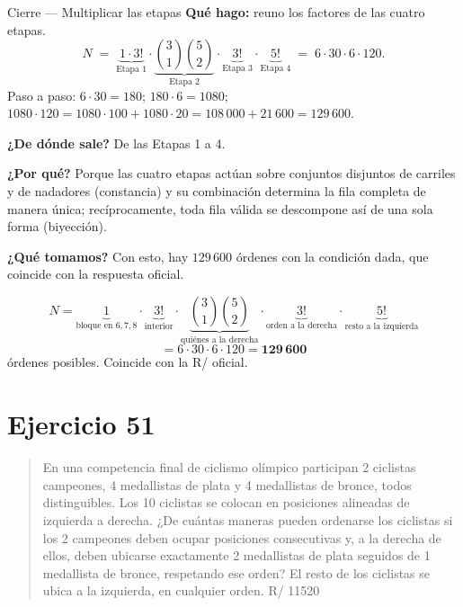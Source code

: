 \documentclass[11pt]{article}
\begin{document}
\begin{paso}{Cierre --- Multiplicar las etapas}
\textbf{Qu\'e hago:} reuno los factores de las cuatro etapas.
\[
N\;=\;\underbrace{1\cdot 3!}_{\text{Etapa 1}}\cdot\underbrace{\binom{3}{1}\binom{5}{2}}_{\text{Etapa 2}}\cdot\underbrace{3!}_{\text{Etapa 3}}\cdot\underbrace{5!}_{\text{Etapa 4}}
\;=\;6\cdot 30\cdot 6\cdot 120 .
\]
Paso a paso: $6\cdot 30=180$; $180\cdot 6=1080$; $1080\cdot 120 = 1080\cdot 100+1080\cdot 20 =
108\,000+21\,600 = 129\,600$.

\textbf{¿De d\'onde sale?} De las Etapas 1 a 4.

\textbf{¿Por qu\'e?} Porque las cuatro etapas actúan sobre conjuntos disjuntos de carriles y de nadadores
(constancia) y su combinaci\'on determina la fila completa de manera \'unica; rec\'iprocamente, toda fila
v\'alida se descompone as\'i de una sola forma (biyecci\'on).

\textbf{¿Qu\'e tomamos?} Con esto, hay $129\,600$ \'ordenes con la condici\'on dada, que coincide con la
respuesta oficial.
\end{paso}

\begin{resp}
\[
N=\underbrace{1}_{\text{bloque en }6,7,8}\cdot\underbrace{3!}_{\text{interior}}\cdot\underbrace{\binom{3}{1}\binom{5}{2}}_{\text{qui\'enes a la derecha}}\cdot\underbrace{3!}_{\text{orden a la derecha}}\cdot\underbrace{5!}_{\text{resto a la izquierda}}
\]
\[
=6\cdot 30\cdot 6\cdot 120=\mathbf{129\,600}
\]
\'ordenes posibles. Coincide con la R/ oficial.
\end{resp}

\section*{Ejercicio 51}

\begin{quote}
En una competencia final de ciclismo ol\'impico participan 2 ciclistas campeones, 4 medallistas de plata y 4
medallistas de bronce, todos distinguibles. Los 10 ciclistas se colocan en posiciones alineadas de izquierda
a derecha. ¿De cu\'antas maneras pueden ordenarse los ciclistas si los 2 campeones deben ocupar posiciones
consecutivas y, a la derecha de ellos, deben ubicarse exactamente 2 medallistas de plata seguidos de 1
medallista de bronce, respetando ese orden? El resto de los ciclistas se ubica a la izquierda, en cualquier
orden. \hfill R/ 11520
\end{quote}
\end{document}
